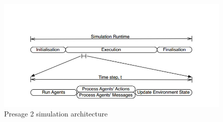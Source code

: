 \begin{figure}[h!]
	\centering
	\includegraphics[scale=0.4]{Images/Presage2.jpg}
	\caption{Presage 2 simulation architecture \cite{Presage_Kyoto:2015}}
	\label{fig:Presage_sim_architecture}
\end{figure}


